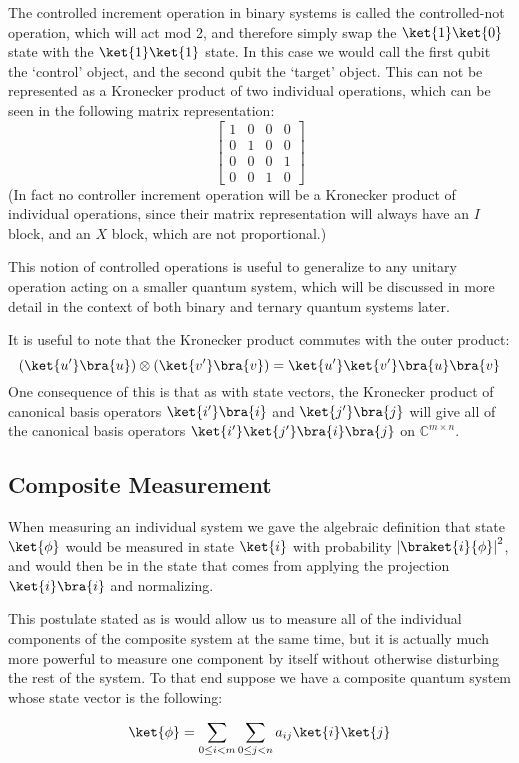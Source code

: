 The controlled increment operation in binary systems is called the controlled-not operation, which will act mod 2, and therefore simply swap the $\ket{1}\ket{0}$ state with the $\ket{1}\ket{1}$ state. In this case we would call the first qubit the `control' object, and the second qubit the `target' object. This can not be represented as a Kronecker product of two individual operations, which can be seen in the following matrix representation:
\[
\left[\begin{matrix}
1&0&0&0\\
0&1&0&0\\
0&0&0&1\\
0&0&1&0
\end{matrix}\right]
\]
(In fact no controller increment operation will be a Kronecker product of individual operations, since their matrix representation will always have an $I$ block, and an $X$ block, which are not proportional.)

This notion of controlled operations is useful to generalize to any unitary operation acting on a smaller quantum system, which will be discussed in more detail in the context of both binary and ternary quantum systems later.

It is useful to note that the Kronecker product commutes with the outer product:
\[(\ket{u'}\bra{u})\otimes(\ket{v'}\bra{v}) = \ket{u'}\ket{v'}\bra{u}\bra{v}\]
One consequence of this is that as with state vectors, the Kronecker product of canonical basis operators $\ket{i'}\bra{i}$ and $\ket{j'}\bra{j}$ will give all of the canonical basis operators $\ket{i'}\ket{j'}\bra{i}\bra{j}$ on $\mathbb{C}^{m \times n}$.
\subsection{Composite Measurement}
When measuring an individual system we gave the algebraic definition that state $\ket{\phi}$ would be measured in state $\ket{i}$ with probability $\ord{\braket{i}{\phi}}^2$, and would then be in the state that comes from applying the projection $\ket{i}\bra{i}$ and normalizing.

This postulate stated as is would allow us to measure all of the individual components of the composite system at the same time, but it is actually much more powerful to measure one component by itself without otherwise disturbing the rest of the system. To that end suppose we have a composite quantum system whose state vector is the following:

\[\ket{\phi} = \sum_{0 \leq i < m}\sum_{0 \leq j < n} a_{ij}\ket{i}\ket{j}\]

